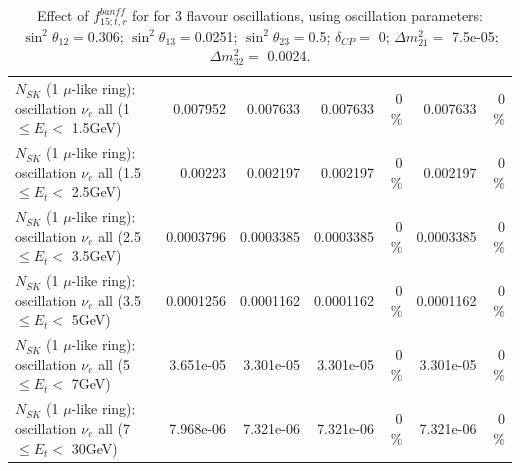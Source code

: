 \begin{table}
\begin{tabular}{| l | r | r | r  r | r  r |}
$N_{SK}$ (1 $\mu$-like ring): oscillation $\nu_{e}$ all (1 $\leq E_{t} <$ 1.5GeV) &        0.007952 &        0.007633 &        0.007633 &        0 \%  &        0.007633 &        0 \%  \\ 
$N_{SK}$ (1 $\mu$-like ring): oscillation $\nu_{e}$ all (1.5 $\leq E_{t} <$ 2.5GeV) &         0.00223 &        0.002197 &        0.002197 &        0 \%  &        0.002197 &        0 \%  \\ 
$N_{SK}$ (1 $\mu$-like ring): oscillation $\nu_{e}$ all (2.5 $\leq E_{t} <$ 3.5GeV) &       0.0003796 &       0.0003385 &       0.0003385 &        0 \%  &       0.0003385 &        0 \%  \\ 
$N_{SK}$ (1 $\mu$-like ring): oscillation $\nu_{e}$ all (3.5 $\leq E_{t} <$ 5GeV) &       0.0001256 &       0.0001162 &       0.0001162 &        0 \%  &       0.0001162 &        0 \%  \\ 
 $N_{SK}$ (1 $\mu$-like ring): oscillation $\nu_{e}$ all (5 $\leq E_{t} <$ 7GeV) &       3.651e-05 &       3.301e-05 &       3.301e-05 &        0 \%  &       3.301e-05 &        0 \%  \\ 
$N_{SK}$ (1 $\mu$-like ring): oscillation $\nu_{e}$ all (7 $\leq E_{t} <$ 30GeV) &       7.968e-06 &       7.321e-06 &       7.321e-06 &        0 \%  &       7.321e-06 &        0 \%  \\ 
\hline
\hline
\end{tabular}
\caption{ Effect of $f_{15; t, r}^{banff}$ for for 3 flavour oscillations, using oscillation parameters:  $\sin^2\theta_{12} = $0.306; $\sin^2\theta_{13} = $0.0251; $\sin^2\theta_{23} = $0.5; $\delta_{CP} = $        0; $\Delta m^2_{21} = $    7.5e-05; $\Delta m^2_{32} = $    0.0024. }
\label{tab:num_banff_15_1RmuT_3f_osc_t13:0.0251}
\end{table}
\clearpage
